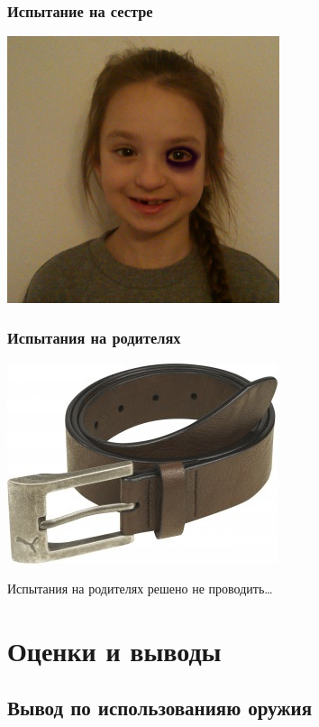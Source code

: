 \begin{frame}
    \frametitle{Испытание на сестре}
    
    \begin{center}
        \includegraphics[width=0.6\textwidth]{fig/nastyaWork}
    \end{center}
\end{frame}

\begin{frame}
    \frametitle{Испытания на родителях}
    
    \begin{center}
        \includegraphics[width=.6\textwidth]{fig/belt}
    \end{center}
    
    Испытания на родителях решено не проводить\ldots
\end{frame}


\section{Оценки и выводы}


\subsection{Вывод по использованияю оружия}

